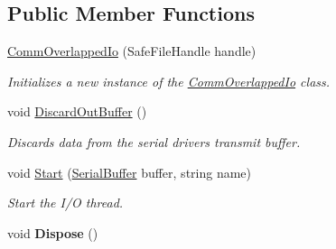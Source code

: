 \subsection*{Public Member Functions}
\begin{DoxyCompactItemize}
\item 
\mbox{\hyperlink{class_r_j_c_p_1_1_i_o_1_1_ports_1_1_native_1_1_windows_1_1_comm_overlapped_io_aa2fc2f81a36458c4d1f3ed13816e7053}{Comm\+Overlapped\+Io}} (Safe\+File\+Handle handle)
\begin{DoxyCompactList}\small\item\em Initializes a new instance of the \mbox{\hyperlink{class_r_j_c_p_1_1_i_o_1_1_ports_1_1_native_1_1_windows_1_1_comm_overlapped_io}{Comm\+Overlapped\+Io}} class. \end{DoxyCompactList}\item 
void \mbox{\hyperlink{class_r_j_c_p_1_1_i_o_1_1_ports_1_1_native_1_1_windows_1_1_comm_overlapped_io_a31b15119e506ec310bde2d3082aaec85}{Discard\+Out\+Buffer}} ()
\begin{DoxyCompactList}\small\item\em Discards data from the serial driver\textquotesingle{}s transmit buffer. \end{DoxyCompactList}\item 
void \mbox{\hyperlink{class_r_j_c_p_1_1_i_o_1_1_ports_1_1_native_1_1_windows_1_1_comm_overlapped_io_a5ffd962fba1ff7536443d1f5b107dbd1}{Start}} (\mbox{\hyperlink{class_r_j_c_p_1_1_i_o_1_1_ports_1_1_native_1_1_serial_buffer}{Serial\+Buffer}} buffer, string name)
\begin{DoxyCompactList}\small\item\em Start the I/O thread. \end{DoxyCompactList}\item 
\mbox{\label{class_r_j_c_p_1_1_i_o_1_1_ports_1_1_native_1_1_windows_1_1_comm_overlapped_io_abace62bfb3837f3961755d5c61ca04ef}} 
void {\bfseries Dispose} ()
\end{DoxyCompactItemize}
